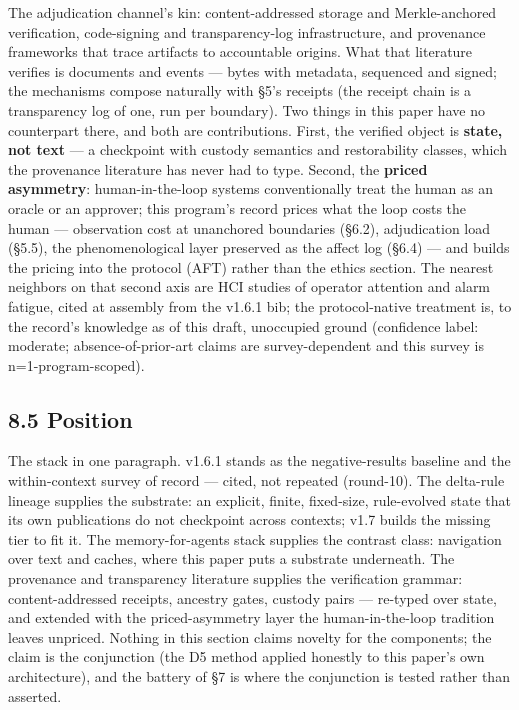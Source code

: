 \documentclass[11pt]{article}
\begin{document}
The adjudication channel's kin: content-addressed storage and Merkle-anchored verification, code-signing and transparency-log infrastructure, and provenance frameworks that trace artifacts to accountable origins. What that literature verifies is documents and events --- bytes with metadata, sequenced and signed; the mechanisms compose naturally with \S{}5's receipts (the receipt chain is a transparency log of one, run per boundary). Two things in this paper have no counterpart there, and both are contributions. First, the verified object is \textbf{state, not text} --- a checkpoint with custody semantics and restorability classes, which the provenance literature has never had to type. Second, the \textbf{priced asymmetry}: human-in-the-loop systems conventionally treat the human as an oracle or an approver; this program's record prices what the loop costs the human --- observation cost at unanchored boundaries (\S{}6.2), adjudication load (\S{}5.5), the phenomenological layer preserved as the affect log (\S{}6.4) --- and builds the pricing into the protocol (AFT) rather than the ethics section. The nearest neighbors on that second axis are HCI studies of operator attention and alarm fatigue, cited at assembly from the v1.6.1 bib; the protocol-native treatment is, to the record's knowledge as of this draft, unoccupied ground (confidence label: moderate; absence-of-prior-art claims are survey-dependent and this survey is n=1-program-scoped).

\subsection{8.5 Position}\label{position}

The stack in one paragraph. v1.6.1 stands as the negative-results baseline and the within-context survey of record --- cited, not repeated (round-10). The delta-rule lineage supplies the substrate: an explicit, finite, fixed-size, rule-evolved state that its own publications do not checkpoint across contexts; v1.7 builds the missing tier to fit it. The memory-for-agents stack supplies the contrast class: navigation over text and caches, where this paper puts a substrate underneath. The provenance and transparency literature supplies the verification grammar: content-addressed receipts, ancestry gates, custody pairs --- re-typed over state, and extended with the priced-asymmetry layer the human-in-the-loop tradition leaves unpriced. Nothing in this section claims novelty for the components; the claim is the conjunction (the D5 method applied honestly to this paper's own architecture), and the battery of \S{}7 is where the conjunction is tested rather than asserted.
\end{document}
